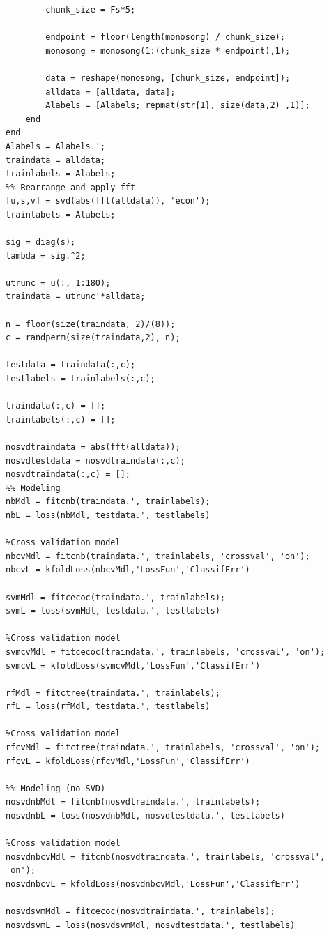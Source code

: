 \documentclass{article}
\begin{document}
\begin{lstlisting}[style=Matlab-editor]
        %5 second intervals
        chunk_size = Fs*5;

        endpoint = floor(length(monosong) / chunk_size);
        monosong = monosong(1:(chunk_size * endpoint),1);

        data = reshape(monosong, [chunk_size, endpoint]);
        alldata = [alldata, data];
        Alabels = [Alabels; repmat(str{1}, size(data,2) ,1)];
    end
end
Alabels = Alabels.';
traindata = alldata;
trainlabels = Alabels;
%% Rearrange and apply fft
[u,s,v] = svd(abs(fft(alldata)), 'econ');
trainlabels = Alabels;

sig = diag(s);
lambda = sig.^2;

utrunc = u(:, 1:180);
traindata = utrunc'*alldata;

n = floor(size(traindata, 2)/(8));
c = randperm(size(traindata,2), n);
    
testdata = traindata(:,c);
testlabels = trainlabels(:,c);

traindata(:,c) = [];
trainlabels(:,c) = [];

nosvdtraindata = abs(fft(alldata));
nosvdtestdata = nosvdtraindata(:,c);
nosvdtraindata(:,c) = [];
%% Modeling
nbMdl = fitcnb(traindata.', trainlabels);
nbL = loss(nbMdl, testdata.', testlabels)

%Cross validation model
nbcvMdl = fitcnb(traindata.', trainlabels, 'crossval', 'on');
nbcvL = kfoldLoss(nbcvMdl,'LossFun','ClassifErr')

svmMdl = fitcecoc(traindata.', trainlabels);
svmL = loss(svmMdl, testdata.', testlabels)

%Cross validation model
svmcvMdl = fitcecoc(traindata.', trainlabels, 'crossval', 'on');
svmcvL = kfoldLoss(svmcvMdl,'LossFun','ClassifErr')

rfMdl = fitctree(traindata.', trainlabels);
rfL = loss(rfMdl, testdata.', testlabels)

%Cross validation model
rfcvMdl = fitctree(traindata.', trainlabels, 'crossval', 'on');
rfcvL = kfoldLoss(rfcvMdl,'LossFun','ClassifErr')

%% Modeling (no SVD)
nosvdnbMdl = fitcnb(nosvdtraindata.', trainlabels);
nosvdnbL = loss(nosvdnbMdl, nosvdtestdata.', testlabels)

%Cross validation model
nosvdnbcvMdl = fitcnb(nosvdtraindata.', trainlabels, 'crossval', 'on');
nosvdnbcvL = kfoldLoss(nosvdnbcvMdl,'LossFun','ClassifErr')

nosvdsvmMdl = fitcecoc(nosvdtraindata.', trainlabels);
nosvdsvmL = loss(nosvdsvmMdl, nosvdtestdata.', testlabels)


\end{lstlisting}
\end{document}
